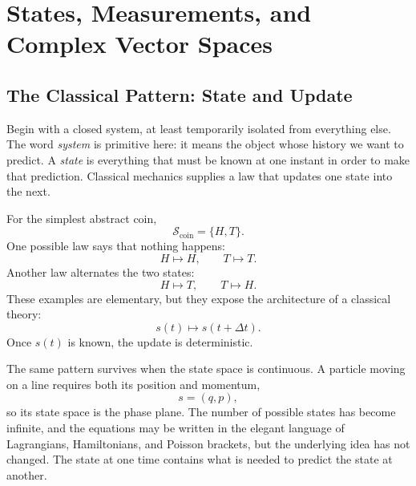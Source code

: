 \chapter{States, Measurements, and Complex Vector Spaces}


\section{The Classical Pattern: State and Update}

Begin with a closed system, at least temporarily isolated from everything else. The word \emph{system} is primitive here: it means the object whose history we want to predict. A \emph{state} is everything that must be known at one instant in order to make that prediction. Classical mechanics supplies a law that updates one state into the next.

For the simplest abstract coin,
\begin{equation}
  \mathcal S_{\mathrm{coin}}=\{H,T\}.
\end{equation}
One possible law says that nothing happens:
\begin{equation}
  H\longmapsto H,
  \qquad
  T\longmapsto T.
\end{equation}
Another law alternates the two states:
\begin{equation}
  H\longmapsto T,
  \qquad
  T\longmapsto H.
\end{equation}
These examples are elementary, but they expose the architecture of a classical theory:
\begin{equation}
  s(t)\longmapsto s(t+\Delta t).
\end{equation}
Once \(s(t)\) is known, the update is deterministic.

The same pattern survives when the state space is continuous. A particle moving on a line requires both its position and momentum,
\begin{equation}
  s=(q,p),
\end{equation}
so its state space is the phase plane. The number of possible states has become infinite, and the equations may be written in the elegant language of Lagrangians, Hamiltonians, and Poisson brackets, but the underlying idea has not changed. The state at one time contains what is needed to predict the state at another.

